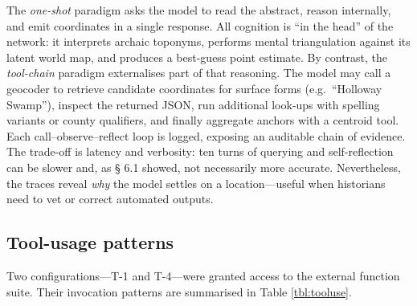 The \emph{one-shot} paradigm asks the model to read the abstract, reason
internally, and emit coordinates in a single response. All cognition is
``in the head'' of the network: it interprets archaic toponyms, performs
mental triangulation against its latent world map, and produces a
best-guess point estimate. By contrast, the \emph{tool-chain} paradigm
externalises part of that reasoning. The model may call a geocoder to
retrieve candidate coordinates for surface forms (e.g.~``Holloway
Swamp''), inspect the returned JSON, run additional look-ups with
spelling variants or county qualifiers, and finally aggregate anchors
with a centroid tool. Each call--observe--reflect loop is logged,
exposing an auditable chain of evidence. The trade-off is latency and
verbosity: ten turns of querying and self-reflection can be slower and,
as § 6.1 showed, not necessarily more accurate. Nevertheless, the traces
reveal \emph{why} the model settles on a location---useful when
historians need to vet or correct automated outputs.

\subsection{Tool-usage patterns}\label{tool-usage-patterns}

Two configurations---T-1 and T-4---were granted access to the external
function suite. Their invocation patterns are summarised in Table
\ref{tbl:tooluse}.


